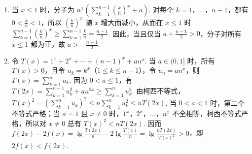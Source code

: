 \documentclass[UTF8,a4paper,oneside,11pt]{ctexbook}
\begin{document}
\begin{solution}
\begin{enumerate}
\item 当 \(x\leqslant1\) 时，分子为 \(n^x\left(\sum_{k=1}^{n-1}\left(\frac{k}{n}\right)^x+a\right)\). 对每个 \(k=1\)，\(\ldots\)，\(n-1\)，都有 \(0<\frac{k}{n}<1\)，所以 \(\left(\frac{k}{n}\right)^x\) 随 \(x\) 增大而减小，从而在 \(x\leqslant1\) 时 \(\sum_{k=1}^{n-1}\left(\frac{k}{n}\right)^x\geqslant\sum_{k=1}^{n-1}\frac{k}{n}=\frac{n-1}{2}\). 因此，当且仅当 \(a+\frac{n-1}{2}>0\)，分子对所有 \(x\leqslant1\) 都为正，故 \(a>-\frac{n-1}{2}\).
\item 令 \(T(x)=1^x+2^x+\cdots+(n-1)^x+an^x\). 当 \(a\in(0,1]\) 时，所有 \(T(x)>0\)，且令 \(u_k=k^x\)（\(1\leqslant k\leqslant n-1\)），令 \(u_n=an^x\)，则 \(T(x)=\sum_{k=1}^{n}u_k\). 因为 \(0<a\leqslant1\)，有 \(T(2x)=\sum_{k=1}^{n-1}u_k^2+an^{2x}\geqslant\sum_{k=1}^{n}u_k^2\). 由柯西不等式，\(T(x)^2=\left(\sum_{k=1}^{n}u_k\right)^2\leqslant n\sum_{k=1}^{n}u_k^2\leqslant nT(2x)\). 当 \(0<a<1\) 时，第二个不等式严格；当 \(a=1\) 且 \(x\neq0\) 时，\(1^x\)，\(2^x\)，\(\ldots\)，\(n^x\) 不全相等，柯西不等式严格，所以对 \(x\neq0\) 总有 \(T(x)^2<nT(2x)\). 因而 \(f(2x)-2f(x)=\lg\frac{T(2x)}{n}-2\lg\frac{T(x)}{n}=\lg\frac{nT(2x)}{T(x)^2}>0\)，即 \(2f(x)<f(2x)\).
\end{enumerate}
\end{solution}

\end{document}
